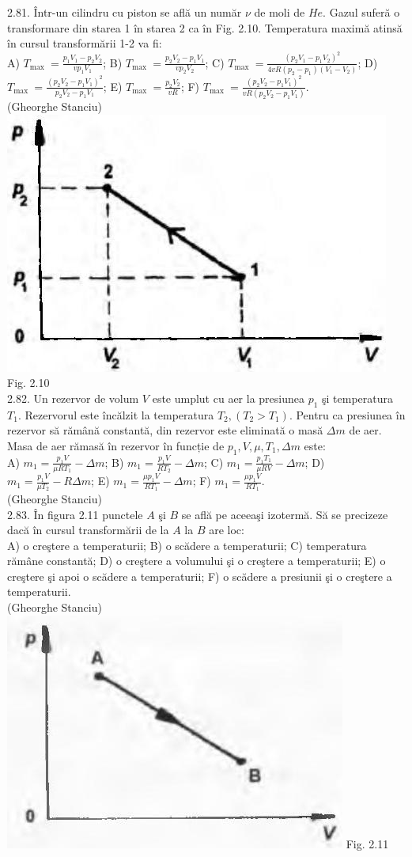 2.81. Într-un cilindru cu piston se află un număr $\nu$ de moli de $He$. Gazul suferă o transformare din starea 1 în starea 2 ca în Fig. 2.10. Temperatura maximă atinsă în cursul transformării 1-2 va fi:\\ A) $T_{\text {max }}=\frac{p_{1} V_{1}-p_{2} V_{2}}{v p_{1} V_{1}}$; B) $T_{\text {max }}=\frac{p_{2} V_{2}-p_{1} V_{1}}{v p_{2} V_{2}}$; C) $T_{\text {max }}=\frac{\left(p_{2} V_{1}-p_{1} V_{2}\right)^{2}}{4 v R\left(p_{2}-p_{1}\right)\left(V_{1}-V_{2}\right)}$; D) $T_{\text {max }}=\frac{\left(p_{2} V_{2}-p_{1} V_{1}\right)^{2}}{p_{2} V_{2}-p_{1} V_{1}}$; E) $T_{\text {max }}=\frac{p_{2} V_{2}}{v R}$; F) $T_{\text {max }}=\frac{\left(p_{2} V_{2}-p_{1} V_{1}\right)^{2}}{v R\left(p_{2} V_{2}-p_{1} V_{1}\right)}$.\\ (Gheorghe Stanciu)\\ \includegraphics[width=0.4\linewidth]{images/2025_07_01_5b3ff9fa0d508c8e9f17g-091} Fig. 2.10\\

2.82. Un rezervor de volum $V$ este umplut cu aer la presiunea $p_{1}$ şi temperatura $T_{1}$. Rezervorul este încălzit la temperatura $T_{2},\left(T_{2}>T_{1}\right)$. Pentru ca presiunea în rezervor să rămână constantă, din rezervor este eliminată o masă $\Delta m$ de aer. Masa de aer rămasă în rezervor în funcție de $p_{1}, V, \mu, T_{1}, \Delta m$ este:\\ A) $m_{1}=\frac{p_{1} V}{\mu R T_{1}}-\Delta m$; B) $m_{1}=\frac{p_{1} V}{R T_{2}}-\Delta m$; C) $m_{1}=\frac{p_{1} T_{1}}{\mu R V}-\Delta m$; D) $m_{1}=\frac{p_{1} V}{\mu T_{2}}-R \Delta m$; E) $m_{1}=\frac{\mu p_{1} V}{R T_{1}}-\Delta m$; F) $m_{1}=\frac{\mu p_{1} V}{R T_{1}}$.\\ (Gheorghe Stanciu)\\

2.83. În figura 2.11 punctele $A$ şi $B$ se află pe aceeaşi izotermă. Să se precizeze dacă în cursul transformării de la $A$ la $B$ are loc:\\ A) o creştere a temperaturii; B) o scădere a temperaturii; C) temperatura rămâne constantă; D) o creştere a volumului şi o creştere a temperaturii; E) o creştere şi apoi o scădere a temperaturii; F) o scădere a presiunii şi o creştere a temperaturii.\\ (Gheorghe Stanciu)\\ \includegraphics[width=0.4\linewidth]{images/2025_07_01_5b3ff9fa0d508c8e9f17g-092} Fig. 2.11\\

